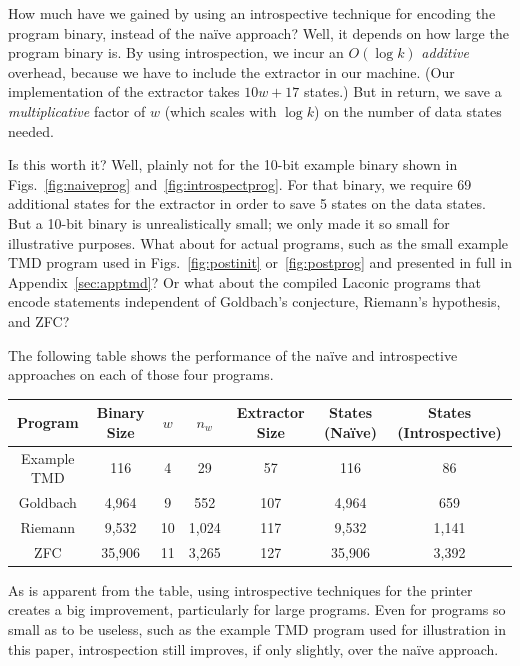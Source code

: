 \documentclass[11pt]{article}
\begin{document}
How much have we gained by using an introspective technique for encoding the program binary, instead of the na\"ive approach? Well, it depends on how large the program binary is. By using introspection, we incur an $O(\log k)$ \emph{additive} overhead, because we have to include the extractor in our machine. (Our implementation of the extractor takes $10w + 17$ states.) But in return, we save a \emph{multiplicative} factor of $w$ (which scales with $\log k$) on the number of data states needed. 

Is this worth it? Well, plainly not for the 10-bit example binary shown in Figs.~\ref{fig:naiveprog} and~\ref{fig:introspectprog}. For that binary, we require 69 additional states for the extractor in order to save 5 states on the data states. But a 10-bit binary is unrealistically small; we only made it so small for illustrative purposes. What about for actual programs, such as the small example TMD program used in Figs.~\ref{fig:postinit} or~\ref{fig:postprog} and presented in full in Appendix~\ref{sec:apptmd}? Or what about the compiled Laconic programs that encode statements independent of Goldbach's conjecture, Riemann's hypothesis, and ZFC?

The following table shows the performance of the na\"ive and introspective approaches on each of those four programs.

\begin{center}
    \begin{tabular}{||c c c c c c c||}
    \hline
    Program & Binary Size & $w$ & $n_w$ & Extractor Size & States (Na\"ive) & States (Introspective) \\ [0.5ex]
    \hline\hline
    Example TMD & 116 & 4 & 29 & 57 & 116 & 86 \\
    \hline
    Goldbach & 4,964 & 9 & 552 & 107 & 4,964 & 659 \\
    \hline
    Riemann & 9,532 & 10 & 1,024 & 117 & 9,532 & 1,141 \\
    \hline 
    ZFC & 35,906 & 11 & 3,265 & 127 & 35,906 & 3,392 \\
    \hline
    \end{tabular}
\end{center}
     
As is apparent from the table, using introspective techniques for the printer creates a big improvement, particularly for large programs. Even for programs so small as to be useless, such as the example TMD program used for illustration in this paper, introspection still improves, if only slightly, over the na\"ive approach. \\
\end{document}
